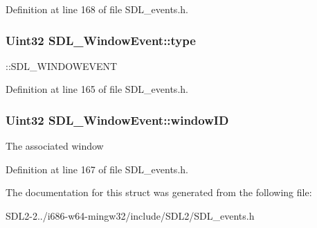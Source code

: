 Definition at line 168 of file S\+D\+L\+\_\+events.\+h.

\hypertarget{structSDL__WindowEvent_a01c8c8fbe8564e690f958d2db560f657}{
\subsubsection[{type}]{\setlength{\rightskip}{0pt plus 5cm}Uint32 S\+D\+L\+\_\+\+Window\+Event\+::type}}\label{structSDL__WindowEvent_a01c8c8fbe8564e690f958d2db560f657}
\+::\+S\+D\+L\+\_\+\+W\+I\+N\+D\+O\+W\+E\+V\+E\+N\+T 

Definition at line 165 of file S\+D\+L\+\_\+events.\+h.

\hypertarget{structSDL__WindowEvent_a4b31796ffc84fbb7f6e9ba33e127619a}{
\subsubsection[{window\+I\+D}]{\setlength{\rightskip}{0pt plus 5cm}Uint32 S\+D\+L\+\_\+\+Window\+Event\+::window\+I\+D}}\label{structSDL__WindowEvent_a4b31796ffc84fbb7f6e9ba33e127619a}
The associated window 

Definition at line 167 of file S\+D\+L\+\_\+events.\+h.



The documentation for this struct was generated from the following file\+:\begin{DoxyCompactItemize}
\item 
S\+D\+L2-\/2../i686-\/w64-\/mingw32/include/\+S\+D\+L2/S\+D\+L\+\_\+events.\+h\end{DoxyCompactItemize}

